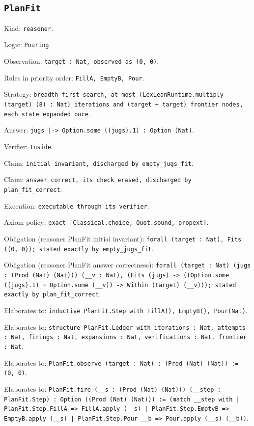 \documentclass[11pt]{article}
\begin{document}
\subsection*{\texttt{PlanFit}}
\noindent Kind: \texttt{reasoner}.\par
\noindent Logic: \texttt{Pouring}.\par
\noindent Observation: \texttt{target : Nat, observed as (0, 0)}.\par
\noindent Rules in priority order: \texttt{FillA, EmptyB, Pour}.\par
\noindent Strategy: \texttt{breadth-first search, at most (LexLeanRuntime.multiply (target) (8) : Nat) iterations and (target + target) frontier nodes, each state expanded once}.\par
\noindent Answer: \texttt{jugs |-> Option.some ((jugs).1) : Option (Nat)}.\par
\noindent Verifier: \texttt{Inside}.\par
\noindent Claim: \texttt{initial invariant, discharged by empty\_jugs\_fit}.\par
\noindent Claim: \texttt{answer correct, its check erased, discharged by plan\_fit\_correct}.\par
\noindent Execution: \texttt{executable through its verifier}.\par
\noindent Axiom policy: \texttt{exact [Classical.choice, Quot.sound, propext]}.\par
\noindent Obligation (reasoner PlanFit initial invariant): \texttt{forall (target : Nat), Fits ((0, 0)); stated exactly by empty\_jugs\_fit}.\par
\noindent Obligation (reasoner PlanFit answer correctness): \texttt{forall (target : Nat) (jugs : (Prod (Nat) (Nat))) (\_\_v : Nat), (Fits (jugs) -> ((Option.some ((jugs).1) = Option.some (\_\_v)) -> Within (target) (\_\_v))); stated exactly by plan\_fit\_correct}.\par
\noindent Elaborates to: \texttt{inductive PlanFit.Step with FillA(), EmptyB(), Pour(Nat)}.\par
\noindent Elaborates to: \texttt{structure PlanFit.Ledger with iterations : Nat, attempts : Nat, firings : Nat, expansions : Nat, verifications : Nat, frontier : Nat}.\par
\noindent Elaborates to: \texttt{PlanFit.observe (target : Nat) : (Prod (Nat) (Nat)) := (0, 0)}.\par
\noindent Elaborates to: \texttt{PlanFit.fire (\_\_s : (Prod (Nat) (Nat))) (\_\_step : PlanFit.Step) : Option ((Prod (Nat) (Nat))) := (match \_\_step with | PlanFit.Step.FillA => FillA.apply (\_\_s) | PlanFit.Step.EmptyB => EmptyB.apply (\_\_s) | PlanFit.Step.Pour \_\_b => Pour.apply (\_\_s) (\_\_b))}.\par
\end{document}
